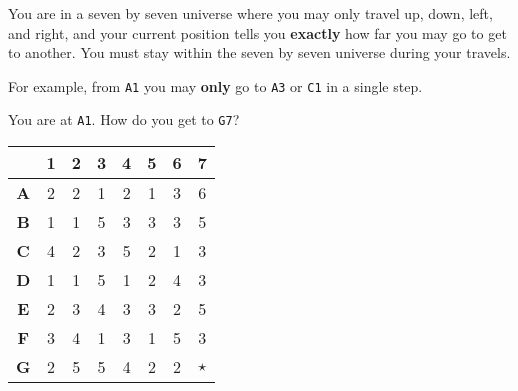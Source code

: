 \documentclass{puzz}
\begin{document}

You are in a seven by seven universe where you may only travel up, down, left,
and right, and your current position tells you \textbf{exactly} how far you may
go to get to another. You must stay within the seven by seven universe during
your travels.

For example, from \texttt{A1} you may \textbf{only} go to \texttt{A3} or
\texttt{C1} in a single step.

You are at \texttt{A1}.  How do you get to \texttt{G7}?

\bigskip
\centering
\Large

\begin{tabular}{c | c | c | c | c | c | c | c |}
     & \textbf{1} & \textbf{2} & \textbf{3} & \textbf{4} & \textbf{5} & \textbf{6} & \textbf{7} \\
    \hline
    \textbf{A} & 2 & 2 & 1 & 2 & 1 & 3 & 6 \\
    \hline
    \textbf{B} & 1 & 1 & 5 & 3 & 3 & 3 & 5 \\
    \hline
    \textbf{C} & 4 & 2 & 3 & 5 & 2 & 1 & 3 \\
    \hline
    \textbf{D} & 1 & 1 & 5 & 1 & 2 & 4 & 3 \\
    \hline
    \textbf{E} & 2 & 3 & 4 & 3 & 3 & 2 & 5 \\
    \hline
    \textbf{F} & 3 & 4 & 1 & 3 & 1 & 5 & 3 \\
    \hline
    \textbf{G} & 2 & 5 & 5 & 4 & 2 & 2 & $\star$ \\
    \hline
\end{tabular}
\end{document}
